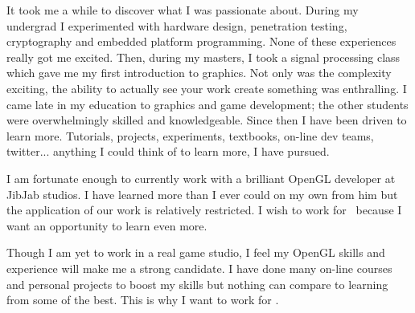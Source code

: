 It took me a while to discover what I was passionate about.
During my undergrad I experimented with hardware design, penetration testing, cryptography and embedded platform programming.
None of these experiences really got me excited.
Then, during my masters, I took a signal processing class which gave me my first introduction to graphics.
Not only was the complexity exciting, the ability to actually see your work create something was enthralling.
I came late in my education to graphics and game development; the other students were overwhelmingly skilled and knowledgeable.
Since then I have been driven to learn more.
Tutorials, projects, experiments, textbooks, on-line dev teams, twitter... anything I could think of to learn more, I have pursued.

I am fortunate enough to currently work with a brilliant OpenGL developer at JibJab studios.
I have learned more than I ever could on my own from him but the application of our work is relatively restricted.
I wish to work for \company~because I want an opportunity to learn even more.

Though I am yet to work in a real game studio, I feel my OpenGL skills and experience will make me a strong candidate.
I have done many on-line courses and personal projects to boost my skills but nothing can compare to learning from some of the best.
This is why I want to work for \company.

